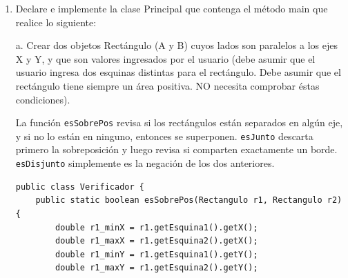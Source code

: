 \documentclass[12pt]{article}
\begin{document}
\begin{enumerate}
\begin{verbatim}
public class Coordenada {
    private double x;
    private double y;

    public Coordenada() {
        this.x = 0;
        this.y = 0;
    }

    public Coordenada(double x, double y) {
        this.x = x;
        this.y = y;
    }

    public Coordenada(Coordenada c) {
        this.x = c.getX();
        this.y = c.getY();
    }

    void setX(double x) {
        this.x = x;
    }

    void setY(double y) {
        this.y = y;
    }

    double getX() {
        return x;
    }

    double getY() {
        return y;
    }

    double distancia(Coordenada c) {
        double dif_x = this.x - c.getX();
        double dif_y = this.y - c.getY();
        return Math.sqrt(dif_x * dif_x + dif_y * dif_y);
    }

    static double distancia(Coordenada c1, Coordenada c2) {
        double dif_x = c1.getX() - c2.getX();
        double dif_y = c1.getY() - c2.getY();
        return Math.sqrt(dif_x * dif_x + dif_y * dif_y);
    }

    public String toString() {
        return "[" + x + ", " + y + "]";
    }
}

\end{verbatim}

    \newpage
    
  \item Declare e implemente la clase Principal que contenga el método main que realice lo siguiente:
    
a. Crear dos objetos Rectángulo (A y B) cuyos lados son paralelos a los ejes X y Y, y que son
valores ingresados por el usuario (debe asumir que el usuario ingresa dos esquinas distintas
para el rectángulo. Debe asumir que el rectángulo tiene siempre un área positiva. NO
necesita comprobar éstas condiciones).

La función \texttt{esSobrePos} revisa si los rectángulos están separados en algún eje, 
y si no lo están en ninguno, entonces se superponen. \texttt{esJunto} descarta 
primero la sobreposición y luego revisa si comparten exactamente un borde.
\texttt{esDisjunto} simplemente es la negación de los dos anteriores.

\begin{verbatim}
public class Verificador {
    public static boolean esSobrePos(Rectangulo r1, Rectangulo r2) {
        double r1_minX = r1.getEsquina1().getX();
        double r1_maxX = r1.getEsquina2().getX();
        double r1_minY = r1.getEsquina1().getY();
        double r1_maxY = r1.getEsquina2().getY();


\end{verbatim}
\end{enumerate}
\end{document}

